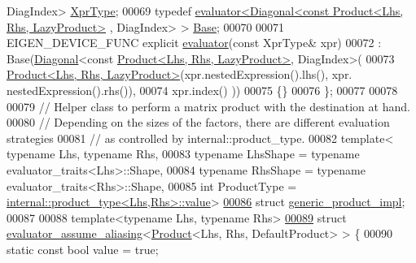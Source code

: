 \begin{DoxyCode}
       DiagIndex> \hyperlink{group___core___module_class_eigen_1_1_diagonal}{XprType};
00069   \textcolor{keyword}{typedef} \hyperlink{struct_eigen_1_1internal_1_1evaluator}{evaluator<Diagonal<const Product<Lhs, Rhs, LazyProduct>}
      , DiagIndex> > \hyperlink{struct_eigen_1_1internal_1_1evaluator}{Base};
00070   
00071   EIGEN\_DEVICE\_FUNC \textcolor{keyword}{explicit} \hyperlink{struct_eigen_1_1internal_1_1evaluator}{evaluator}(\textcolor{keyword}{const} XprType& xpr)
00072     : Base(\hyperlink{group___core___module_class_eigen_1_1_diagonal}{Diagonal}<\textcolor{keyword}{const} \hyperlink{group___core___module_class_eigen_1_1_product}{Product<Lhs, Rhs, LazyProduct>}, DiagIndex>(
00073         \hyperlink{group___core___module_class_eigen_1_1_product}{Product<Lhs, Rhs, LazyProduct>}(xpr.nestedExpression().lhs(), xpr.
      nestedExpression().rhs()),
00074         xpr.index() ))
00075   \{\}
00076 \};
00077 
00078 
00079 \textcolor{comment}{// Helper class to perform a matrix product with the destination at hand.}
00080 \textcolor{comment}{// Depending on the sizes of the factors, there are different evaluation strategies}
00081 \textcolor{comment}{// as controlled by internal::product\_type.}
00082 \textcolor{keyword}{template}< \textcolor{keyword}{typename} Lhs, \textcolor{keyword}{typename} Rhs,
00083           \textcolor{keyword}{typename} LhsShape = \textcolor{keyword}{typename} evaluator\_traits<Lhs>::Shape,
00084           \textcolor{keyword}{typename} RhsShape = \textcolor{keyword}{typename} evaluator\_traits<Rhs>::Shape,
00085           \textcolor{keywordtype}{int} ProductType = \hyperlink{struct_eigen_1_1internal_1_1product__type}{internal::product\_type<Lhs,Rhs>::value}>
\hyperlink{struct_eigen_1_1internal_1_1generic__product__impl}{00086} \textcolor{keyword}{struct }\hyperlink{struct_eigen_1_1internal_1_1generic__product__impl}{generic\_product\_impl};
00087 
00088 \textcolor{keyword}{template}<\textcolor{keyword}{typename} Lhs, \textcolor{keyword}{typename} Rhs>
\hyperlink{struct_eigen_1_1internal_1_1evaluator__assume__aliasing_3_01_product_3_01_lhs_00_01_rhs_00_01_default_product_01_4_01_4}{00089} \textcolor{keyword}{struct }\hyperlink{struct_eigen_1_1internal_1_1evaluator__assume__aliasing}{evaluator\_assume\_aliasing}<\hyperlink{group___core___module_class_eigen_1_1_product}{Product}<Lhs, Rhs, DefaultProduct> > \{
00090   \textcolor{keyword}{static} \textcolor{keyword}{const} \textcolor{keywordtype}{bool} value = \textcolor{keyword}{true};

\end{DoxyCode}
